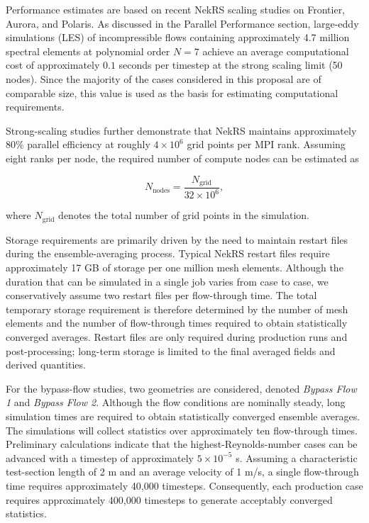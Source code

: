 Performance estimates are based on recent NekRS scaling studies on Frontier, Aurora, and Polaris. As discussed in the Parallel Performance section, large-eddy simulations (LES) of incompressible flows containing approximately 4.7 million spectral elements at polynomial order $N=7$ achieve an average computational cost of approximately $0.1$ seconds per timestep at the strong scaling limit (50 nodes). Since the majority of the cases considered in this proposal are of comparable size, this value is used as the basis for estimating computational requirements.

Strong-scaling studies further demonstrate that NekRS maintains approximately 80\% parallel efficiency at roughly $4\times10^6$ grid points per MPI rank. Assuming eight ranks per node, the required number of compute nodes can be estimated as

\begin{equation}
N_{\mathrm{nodes}}
=
\frac{N_{\mathrm{grid}}}
     {32\times10^{6}},
     \label{eq_01}
\end{equation}

where $N_{\mathrm{grid}}$ denotes the total number of grid points in the simulation.

Storage requirements are primarily driven by the need to maintain restart files during the ensemble-averaging process. Typical NekRS restart files require approximately 17 GB of storage per one million mesh elements. Although the duration that can be simulated in a single job varies from case to case, we conservatively assume two restart files per flow-through time. The total temporary storage requirement is therefore determined by the number of mesh elements and the number of flow-through times required to obtain statistically converged averages. Restart files are only required during production runs and post-processing; long-term storage is limited to the final averaged fields and derived quantities.

For the bypass-flow studies, two geometries are considered, denoted \emph{Bypass Flow 1} and \emph{Bypass Flow 2}. Although the flow conditions are nominally steady, long simulation times are required to obtain statistically converged ensemble averages. The simulations will collect statistics over approximately ten flow-through times. Preliminary calculations indicate that the highest-Reynolds-number cases can be advanced with a timestep of approximately $5\times10^{-5}$ s. Assuming a characteristic test-section length of 2 m and an average velocity of 1 m/s, a single flow-through time requires approximately 40,000 timesteps. Consequently, each production case requires approximately 400,000 timesteps to generate acceptably converged statistics.

